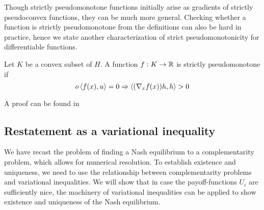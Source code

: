 Though strictly pseudomonotone functions initially arise as gradients of strictly pseudoconvex functions, they can be much more general. Checking whether a function is strictly pseudomonotone from the definitions can also be hard in practice, hence we state another characterization of strict pseudomonotonicity for differentiable functions.
  \begin{lemma}
  \label{lem:strict_pm}
  Let $K$ be a convex subset of $H$. A function $f: K \to \mathbb{R}$ is strictly pseudomonotone if
  \begin{equation}o
    \left \langle f(x),u \right \rangle = 0 \Rightarrow \left \langle (\nabla_x f(x))h,h \right \rangle > 0
  \end{equation}
\end{lemma}
A proof can be found in \citep[Proposition 2.8, p.96]{hadjisavvas2006handbook}


\subsection{Restatement as a variational inequality}
We have recast the problem of finding a Nash equilibrium to a complementarity problem, which allows for numerical resolution. To establish existence and uniqueness, we need to use the relationship between complementarity problems and variational inequalities. We will show that in case the payoff-functions $U_i $ are sufficiently nice, the machinery of variational inequalities can be applied to show existence and uniqueness of the Nash equilibrium.

